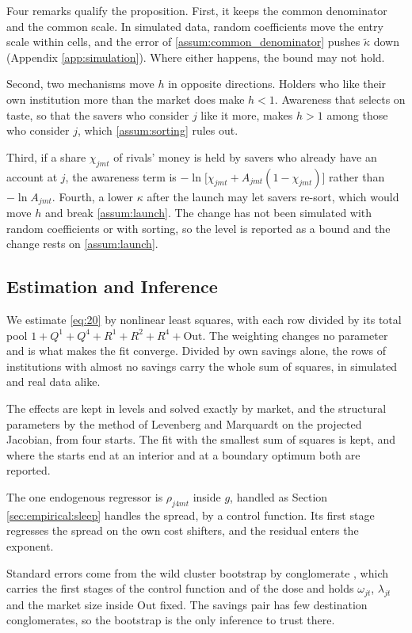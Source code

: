 Four remarks qualify the proposition. First, it keeps the common denominator and the common scale. In simulated data, random coefficients move the entry scale within cells, and the error of \ref{assum:common_denominator} pushes $\tilde{\kappa}$ down (Appendix \ref{app:simulation}). Where either happens, the bound may not hold.

Second, two mechanisms move $h$ in opposite directions. Holders who like their own institution more than the market does make $h<1$. Awareness that selects on taste, so that the savers who consider $j$ like it more, makes $h>1$ among those who consider $j$, which \ref{assum:sorting} rules out.

Third, if a share $\chi_{jmt}$ of rivals' money is held by savers who already have an account at $j$, the awareness term is $-\ln\bigl[\chi_{jmt}+A_{jmt}(1-\chi_{jmt})\bigr]$ rather than $-\ln A_{jmt}$. Fourth, a lower $\kappa$ after the launch may let savers re-sort, which would move $h$ and break \ref{assum:launch}. The change has not been simulated with random coefficients or with sorting, so the level is reported as a bound and the change rests on \ref{assum:launch}.

\subsection{Estimation and Inference}\label{app:netflow:estimation}

We estimate \eqref{eq:20} by nonlinear least squares, with each row divided by its total pool $1+Q^{1}+Q^{4}+R^{1}+R^{2}+R^{4}+\mathrm{Out}$. The weighting changes no parameter and is what makes the fit converge. Divided by own savings alone, the rows of institutions with almost no savings carry the whole sum of squares, in simulated and real data alike.

The effects are kept in levels and solved exactly by market, and the structural parameters by the method of Levenberg and Marquardt on the projected Jacobian, from four starts. The fit with the smallest sum of squares is kept, and where the starts end at an interior and at a boundary optimum both are reported.

The one endogenous regressor is $\rho_{j4mt}$ inside $g$, handled as Section \ref{sec:empirical:sleep} handles the spread, by a control function. Its first stage regresses the spread on the own cost shifters, and the residual enters the exponent.

Standard errors come from the wild cluster bootstrap by conglomerate \parencite{cameron2008bootstrap}, which carries the first stages of the control function and of the dose and holds $\omega_{jt}$, $\lambda_{jt}$ and the market size inside $\mathrm{Out}$ fixed. The savings pair has few destination conglomerates, so the bootstrap is the only inference to trust there.

